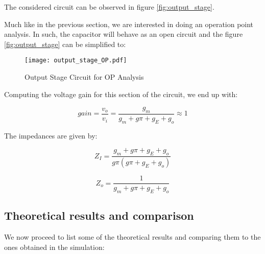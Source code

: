 The considered circuit can be observed in figure \ref{fig:output_stage}.


Much like in the previous section, we are interested in doing an operation point analysis. In such, the capacitor will behave as an open circuit and the figure \ref{fig:output_stage} can be simplified to:

\begin{figure}[h!]
\centering
\texttt{[image: output\_stage\_OP.pdf]}
\caption{Output Stage Circuit for OP Analysis}
\label{fig:output_stage_figure_OP}
\end{figure}


Computing the voltage gain for this section of the circuit, we end up with:

\begin{equation}
gain=\frac{v_o}{v_i}=\frac{g_m}{g_m+g{\pi}+g_E+g_o} \approx 1
\end{equation}

The impedances are given by:

\begin{equation}
Z_I=\frac{g_m+g{\pi}+g_E+g_o}{g{\pi}(g{\pi}+g_E+g_o)}
\end{equation}


\begin{equation}
Z_o=\frac{1}{g_m+g{\pi}+g_E+g_o}
\end{equation}

\subsection {Theoretical results and comparison}

We now proceed to list some of the theoretical results and comparing them to the ones obtained in the simulation:

